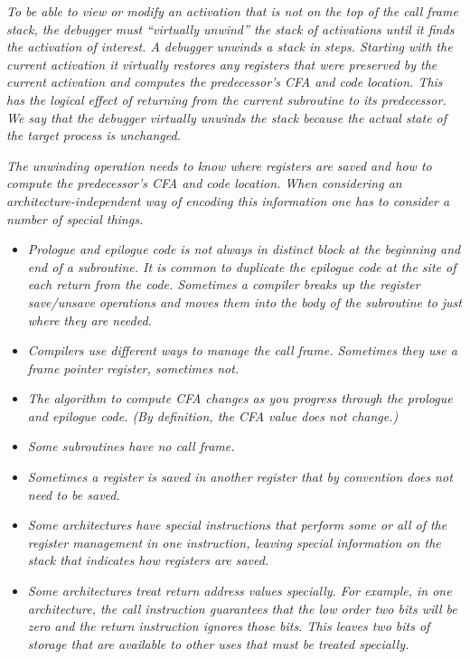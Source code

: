 \textit{To be able to view or modify an activation that is not
on the top of the call frame stack, the debugger must
``virtually unwind'' the stack of activations until
it finds the activation of interest.  A debugger unwinds
a stack in steps. Starting with the current activation it
virtually restores any registers that were preserved by the
current activation and computes the predecessor’s CFA and
code location. This has the logical effect of returning from
the current subroutine to its predecessor. We say that the
debugger virtually unwinds the stack because the actual state
of the target process is unchanged.}

\textit{The unwinding operation needs to know where registers are
saved and how to compute the predecessor’s CFA and code
location. When considering an architecture-independent way
of encoding this information one has to consider a number of
special things.}


\begin{itemize} %

\item \textit{Prologue and epilogue code is not always in 
distinct block
at the beginning and end of a subroutine. It is common
to duplicate the epilogue code at the site of each return
from the code. Sometimes a compiler breaks up the register
save/unsave operations and moves them into the body of the
subroutine to just where they are needed.}


\item \textit{Compilers use different ways to manage the call
frame. Sometimes they use a frame pointer register, sometimes
not.}

\item \textit{The algorithm to compute CFA changes as you progress through
the prologue and epilogue code. (By definition, the CFA value
does not change.)}

\item \textit{Some subroutines have no call frame.}

\item \textit{Sometimes a register is saved in another register that by
convention does not need to be saved.}

\item \textit{Some architectures have special instructions that perform
some or all of the register management in one instruction,
leaving special information on the stack that indicates how
registers are saved.}

\item \textit{Some architectures treat return address values specially. For
example, in one architecture, the call instruction guarantees
that the low order two bits will be zero and the return
instruction ignores those bits. This leaves two bits of
storage that are available to other uses that must be treated
specially.}


\end{itemize}


